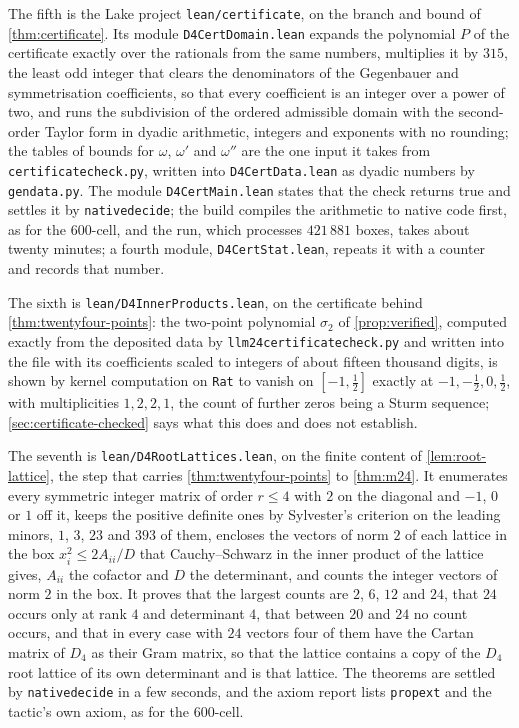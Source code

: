 \documentclass[11pt,reqno]{amsart}
\renewcommand{\_}{\origunderscore\allowbreak}
\numberwithin{equation}{section}
\theoremstyle{plain}
\theoremstyle{definition}
\theoremstyle{remark}
\begin{document}
The fifth is the Lake project \texttt{lean/certificate}, on the
branch and bound of \cref{thm:certificate}. Its module
\texttt{D4CertDomain.lean} expands the polynomial $P$ of the certificate
exactly over the rationals from the same numbers, multiplies it by
$315$, the least odd integer that clears the denominators of the
Gegenbauer and symmetrisation coefficients, so that every coefficient
is an integer over a power of two, and runs the subdivision of the
ordered admissible domain with the second-order Taylor form in dyadic
arithmetic, integers and exponents with no rounding; the tables of
bounds for $\omega$, $\omega'$ and $\omega''$ are the one input it
takes from \texttt{certificate\_check.py}, written into
\texttt{D4CertData.lean} as dyadic numbers by \texttt{gen\_data.py}.
The module \texttt{D4CertMain.lean} states that the check returns true
and settles it by \texttt{native\_decide}; the build compiles the
arithmetic to native code first, as for the $600$-cell, and the run,
which processes $421\,881$ boxes, takes about twenty minutes; a fourth
module, \texttt{D4CertStat.lean}, repeats it with a counter and records
that number.

The sixth is \texttt{lean/D4InnerProducts.lean}, on the certificate
behind \cref{thm:twentyfour-points}: the two-point polynomial
$\sigma_2$ of \cref{prop:verified}, computed exactly from the deposited
data \cite{LLM24data} by \texttt{llm24\_certificate\_check.py}
and written into the file with its coefficients scaled to integers of
about fifteen thousand digits, is shown by kernel computation on
\texttt{Rat} to vanish on $[-1,\tfrac12]$ exactly at
$-1,-\tfrac12,0,\tfrac12$, with multiplicities $1,2,2,1$, the count of
further zeros being a Sturm sequence; \cref{sec:certificate-checked} says what
this does and does not establish.

The seventh is \texttt{lean/D4RootLattices.lean}, on the finite content
of \cref{lem:root-lattice}, the step that carries
\cref{thm:twentyfour-points} to \cref{thm:m24}. It enumerates every
symmetric integer matrix of order $r\le4$ with $2$ on the diagonal and
$-1$, $0$ or $1$ off it, keeps the positive definite ones by Sylvester's
criterion on the leading minors, $1$, $3$, $23$ and $393$ of them,
encloses the vectors of norm $2$ of each lattice in the box
$x_i^2\le2A_{ii}/D$ that Cauchy--Schwarz in the inner product of the
lattice gives, $A_{ii}$ the cofactor and $D$ the determinant, and counts
the integer vectors of norm $2$ in the box. It proves that the largest
counts are $2$, $6$, $12$ and $24$, that $24$ occurs only at rank $4$
and determinant $4$, that between $20$ and $24$ no count occurs, and
that in every case with $24$ vectors four of them have the Cartan matrix
of $D_4$ as their Gram matrix, so that the lattice contains a copy of
the $D_4$ root lattice of its own determinant and is that lattice. The
theorems are settled by \texttt{native\_decide} in a few seconds, and
the axiom report lists \texttt{propext} and the tactic's own axiom, as
for the $600$-cell.
\end{document}
